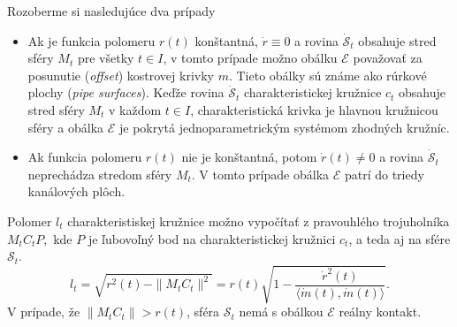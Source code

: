 Rozoberme si nasledujúce dva prípady
\begin{itemize}
\item Ak je funkcia polomeru $r(t)$ konštantná, $\dot{r} \equiv 0$ a rovina $\mathcal{\dot{S}}_t$ obsahuje stred sféry $M_t$ pre všetky $t \in I$, v tomto prípade možno obálku $\mathcal{E}$ považovať za posunutie (\textit{offset}) kostrovej krivky $m$. Tieto obálky sú známe ako rúrkové plochy (\textit{pipe surfaces}). Keďže rovina $\mathcal{\dot{S}}_t$ charakteristickej kružnice $c_t$ obsahuje stred sféry $M_t$ v každom $t \in I$, charakteristická krivka je hlavnou kružnicou sféry a obálka $\mathcal{E}$ je pokrytá jednoparametrickým systémom zhodných kružníc.
\item Ak funkcia polomeru $r(t)$ nie je konštantná, potom $\dot{r}(t) \neq 0$ a rovina $\mathcal{\dot{S}}_t$  neprechádza stredom sféry $M_t$. V tomto prípade obálka $\mathcal{E}$ patrí do triedy kanálových plôch.
\end{itemize}

Polomer $l_t$ charakteristiskej kružnice  možno vypočítať z pravouhlého trojuholníka $M_tC_tP,$ kde $P$ je ľubovoľný bod na charakteristickej kružnici $c_t$, a teda aj na sfére $\mathcal{S}_t.$
$$ l_t = \sqrt{r^2(t) - \|M_tC_t\|^2} = r(t) \sqrt{ 1 - \frac{\dot{r}^2(t)}{\langle \dot{m}(t), \dot{m}(t) \rangle}}. $$
V prípade, že $ \|M_tC_t\| > r(t)$, sféra $\mathcal{S}_t$ nemá s obálkou $\mathcal{E}$ reálny kontakt. 

